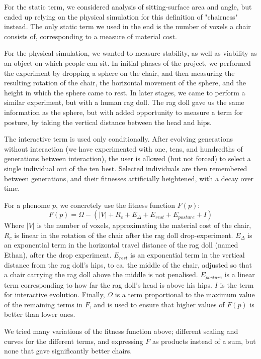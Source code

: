 For the static term, we considered analysis of sitting-surface area and angle,
but ended up relying on the physical simulation for this definition of
"chairness" instead. The only static term we used in the end is the number of
voxels a chair consists of, corresponding to a measure of material cost.

For the physical simulation, we wanted to measure stability, as well as
viability as an object on which people can sit. In initial phases of the
project, we performed the experiment by dropping a sphere on the chair, and then
measuring the resulting rotation of the chair, the horizontal movement of the
sphere, and the height in which the sphere came to rest. In later stages, we
came to perform a similar experiment, but with a human rag doll. The rag doll
gave us the same information as the sphere, but with added opportunity to
measure a term for posture, by taking the vertical distance between the head and
hips.

The interactive term is used only conditionally. After evolving generations
without interaction (we have experimented with one, tens, and hundredths of
generations between interaction), the user is allowed (but not forced) to select
a single individual out of the ten best. Selected individuals are then
remembered between generations, and their fitnesses artificially heightened,
with a decay over time.

For a phenome $p$, we concretely use the fitness function $F(p)$:
$$F(p) = \Omega - (\left|V\right| + R_c + E_{\Delta} + E_{rest} + E_{posture} +
I)$$
Where $|V|$ is the number of voxels, approximating the material cost of the
chair, $R_c$ is linear in the rotation of the chair after the rag doll
drop-experiment. $E_{\Delta}$ is an exponential term in the horizontal travel
distance of the rag doll (named Ethan), after the drop experiment. $E_{rest}$ is
an exponential term in the vertical distance from the rag doll's hips, to ca.
the middle of the chair, adjusted so that a chair carrying the rag doll above
the middle is not penalised. $E_{posture}$ is a linear term corresponding to how
far the rag doll's head is above his hips. $I$ is the term for
interactive evolution. Finally, $\Omega$ is a term proportional to the maximum
value of the remaining terms in $F$, and is used to ensure that higher values of
$F(p)$ is better than lower ones.

We tried many variations of the fitness function above; different scaling and
curves for the different terms, and expressing $F$ as products instead of a
sum, but none that gave significantly better chairs.

